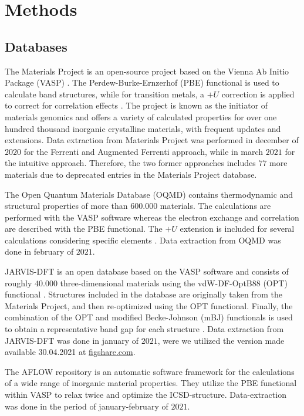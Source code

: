 \documentclass[superscriptaddress,unsortedaddress,
 amsmath,amssymb,
 aps,
]{revtex4-2}
\begin{document}
\section*{Methods}

\subsection*{Databases}
The Materials Project \cite{Jain2013, Jain2018} is an open-source project based on the Vienna Ab Initio Package (VASP) \cite{Kresse1996}. The Perdew-Burke-Ernzerhof \cite{Perdew1996} (PBE) functional is used to calculate band structures, while for transition metals, a $+U$ correction is applied to correct for correlation effects \cite{Wang2006}. The project is known as the initiator of materials genomics and offers a variety of calculated properties for over one hundred thousand inorganic crystalline materials, with frequent updates and extensions. Data extraction from Materials Project was performed in december of $2020$ for the Ferrenti and Augmented Ferrenti approach, while in march $2021$ for the intuitive approach. Therefore, the two former approaches includes $77$ more materials due to deprecated entries in the Materials Project database.

The Open Quantum Materials Database (OQMD) \cite{Saal2013, Kirklin2015} contains thermodynamic and structural properties of more than $600.000$  materials. The calculations are performed with the VASP software whereas the electron exchange and correlation are described with the PBE functional. The $+U$ extension is included for several calculations considering specific elements \cite{Stevanovic2012}. Data extraction from OQMD was done in february of $2021$. 

JARVIS-DFT \cite{Choudhary2020} is an open database based on the VASP software and consists of roughly $40.000$ three-dimensional materials using the vdW-DF-OptB88 (OPT) functional \cite{Thonhauser2007, Klimes2011}. Structures included in the database are originally taken from the Materials
Project, and then re-optimized using the OPT functional. Finally, the combination of the OPT and modified Becke-Johnson (mBJ) functionals is used to obtain a representative band gap for each structure \cite{Choudhary2018a}. Data extraction from JARVIS-DFT was done in january of $2021$, were we utilized the version made available 30.04.2021 at \url{figshare.com}.

The AFLOW \cite{Curtarolo2012, Curtarolo2012a, Calderon2015} repository is an automatic software framework for the calculations of a wide range of inorganic material properties. They utilize the PBE functional within VASP
to relax twice and optimize the ICSD-structure. Data-extraction was done in the period of january-february of $2021$.
\end{document}

